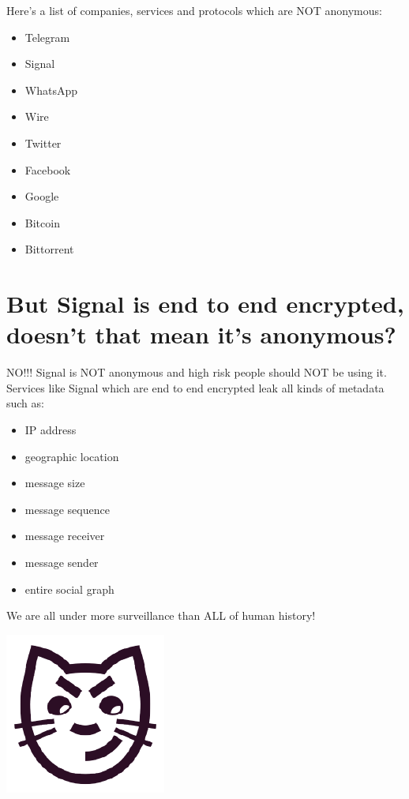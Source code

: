 \documentclass[statementpaper,oneside,article,14pt]{memoir}
\begin{document}
Here's a list of companies, services and protocols which are NOT anonymous:

\begin{itemize}
  \item Telegram
  \item Signal
  \item WhatsApp
  \item Wire
  \item Twitter
  \item Facebook
  \item Google
  \item Bitcoin
  \item Bittorrent
\end{itemize}

\newpage

\section{But Signal is end to end encrypted, doesn't that mean it's anonymous?}

NO!!! Signal is NOT anonymous and high risk people should NOT be using it.
Services like Signal which are end to end encrypted leak all kinds of metadata such as:

\begin{itemize}
\item IP address
\item geographic location
\item message size
\item message sequence
\item message receiver
\item message sender
\item entire social graph
\end{itemize}










\newpage

\Large We are all under more surveillance than ALL of human history!

\begin{center}
  \includegraphics[scale=.2]{katzenpost_logo} \\
\end{center}
\end{document}
